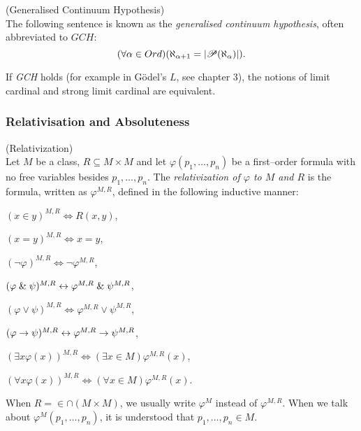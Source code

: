 \begin{definition}{(Generalised Continuum Hypothesis)}\label{def:gch}\\
The following sentence is known as the \emph{generalised continuum hypothesis}, often abbreviated to $GCH$:
\begin{equation}
(\forall \alpha \in Ord)(\aleph_{\alpha+1}=|\mathscr{P} (\aleph_\alpha)|)\mbox{.}
\end{equation}
\end{definition}
If \emph{GCH} holds (for example in Gödel's $L$, see chapter 3), the notions of limit cardinal and strong limit cardinal are equivalent.

\subsubsection{Relativisation and Absoluteness} %
\begin{definition}{(Relativization)}\label{def:relativization}\\
Let $M$ be a class, $R \subseteq M\times M$ and let $\varphi(p_1, \ldots, p_n)$ be a first–order formula with no free variables besides $p_1, \ldots, p_n$. 
The \emph{relativization of $\varphi$ to $M$ and $R$} is the formula, written as $\varphi^{M, R}$, defined in the following inductive manner:
\bce[(i)]
\item $(x \in y)^{M,R} \iff R(x, y)$,
\item $(x = y)^{M,R} \iff x = y$,
\item $(\neg \varphi)^{M,R} \iff \neg \varphi^{M,R}$,
\item $(\varphi \mathrel{\&} \psi)^{M,R} \leftrightarrow \varphi^{M,R} \mathrel{\&} \psi^{M,R}$,
\item $(\varphi \lor \psi)^{M,R} \iff \varphi^{M,R} \lor \psi^{M,R}$,
\item $(\varphi \rightarrow \psi)^{M,R} \leftrightarrow \varphi^{M,R} \rightarrow \psi^{M,R}$,
\item $(\exists x \varphi(x))^{M,R} \iff (\exists x \in M) \varphi^{M,R}(x)$,
\item $(\forall x \varphi(x))^{M,R} \iff (\forall x \in M) \varphi^{M,R}(x)$.
\ece

\end{definition}
When $R=\in\cap(M \times M)$, we usually write $\varphi^M$ instead of $\varphi^{M, R}$. When we talk about $\varphi^M(p_1, \ldots, p_n)$, it is understood that $p_1, \ldots, p_n \in M$.


